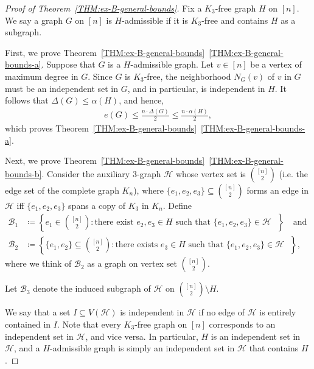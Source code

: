 \documentclass[11pt,a4paper]{article}
\newcommand{\graph}{H}
\begin{document}
\begin{proof}[Proof of Theorem~\ref{THM:ex-B-general-bounds}]
    Fix a $K_{3}$-free graph $\graph$ on $[n]$.     
    We say a graph $G$ on $[n]$ is $\graph$-admissible if it is $K_{3}$-free and contains $\graph$ as a subgraph. 
    
    First, we prove Theorem~\ref{THM:ex-B-general-bounds}~\ref{THM:ex-B-general-bounds-a}. 
    Suppose that $G$ is a $\graph$-admissible graph. 
    Let $v \in [n]$ be a vertex of maximum degree in $G$. 
    Since $G$ is $K_{3}$-free, the neighborhood $N_{G}(v)$ of $v$ in $G$ must be an independent set in $G$, and in particular, is independent in $\graph$.
    It follows that $\Delta(G) \le \alpha(\graph)$, and hence, 
    \begin{align*}
        e(G)
        \le \frac{n \cdot \Delta(G)}{2}  
        \le \frac{n \cdot \alpha(\graph)}{2},
    \end{align*}
    which proves Theorem~\ref{THM:ex-B-general-bounds}~\ref{THM:ex-B-general-bounds-a}. 

    Next, we prove Theorem~\ref{THM:ex-B-general-bounds}~\ref{THM:ex-B-general-bounds-b}. 
    Consider the auxiliary $3$-graph $\mathcal{H}$ whose vertex set is $\binom{[n]}{2}$ (i.e. the edge set of the complete graph $K_n$), where $\{e_1, e_2, e_3\} \subseteq \binom{[n]}{2}$ forms an edge in $\mathcal{H}$ iff $\{e_1, e_2, e_3\}$ spans a copy of $K_3$ in $K_n$.
    Define 
    \begin{align*}
        \mathcal{B}_{1}
        & \coloneqq \left\{e_1 \in \binom{[n]}{2} \colon \text{there exist $e_2, e_3 \in \graph$ such that $\{e_1, e_2, e_3\} \in \mathcal{H}$ }\right\} \quad\text{and}\quad \\[0.5em]
        \mathcal{B}_{2}
        & \coloneqq \left\{ \{e_1, e_2\} \subseteq \binom{[n]}{2} \colon \text{there exists $e_3 \in \graph$ such that $\{e_1, e_2, e_3\} \in \mathcal{H}$ }\right\},
    \end{align*}
    where we think of $\mathcal{B}_2$ as a graph on vertex set $\binom{[n]}{2}$.
    
    Let $\mathcal{B}_{3}$ denote the induced subgraph of $\mathcal{H}$ on $\binom{[n]}{2} \setminus \graph$.


    We say that a set $I \subseteq V(\mathcal{H})$ is independent in $\mathcal{H}$ if no edge of $\mathcal{H}$ is entirely contained in $I$. Note that every $K_3$-free graph on $[n]$ corresponds to an independent set in $\mathcal{H}$, and vice versa.
    In particular, $\graph$ is an independent set in $\mathcal{H}$, and a $\graph$-admissible graph is simply an independent set in $\mathcal{H}$ that contains $\graph$. 


\end{proof}
\end{document}
